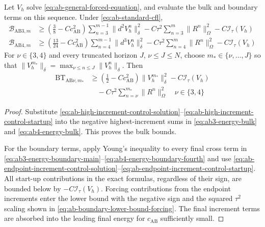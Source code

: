 \documentclass[11pt]{article}
\begin{document}
\begin{lem}
\label{lem:ab-bulk-boundary-lower-bounds}
Let \(V_h\) solve \eqref{eq:ab-general-forced-equation}, and evaluate the
bulk and boundary terms on this sequence. Under
\eqref{eq:ab-standard-cfl},
\begin{align}
\mathcal B_{\mathrm{AB3},m}
&\ge\left(\frac38-Cc_{\mathrm{AB}}^2\right)
\sum_{n=3}^{m-1}\|d^2V_h^n\|_{\delta}^2
-C\tau^2\sum_{n=3}^{m}\|R^n\|_{\Omega}^2
-C\mathcal I_{\tau}(V_h) \label{eq:ab3-bulk-lower-bound}\\
\mathcal B_{\mathrm{AB4},m}
&\ge\left(\frac{13}{24}-Cc_{\mathrm{AB}}^2\right)
\sum_{n=4}^{m-1}\|d^3V_h^n\|_{\delta}^2
-C\tau^2\sum_{n=4}^{m}\|R^n\|_{\Omega}^2
-C\mathcal I_{\tau}(V_h) \label{eq:ab4-bulk-lower-bound}
\end{align}
For \(\nu\in\{3,4\}\) and every truncated horizon \(J\), \(\nu\le J\le N\),
choose \(m_*\in\{\nu,\ldots,J\}\) so that
\(\|V_h^{m_*}\|_{\delta}=\max_{\nu\le n\le J}\|V_h^n\|_{\delta}\). Then
\begin{align}
\mathrm{BT}_{\mathrm{AB}\nu,m_*}
&\ge\left(\frac12-Cc_{\mathrm{AB}}^2\right)
\|V_h^{m_*}\|_{\delta}^2
-C\mathcal I_{\tau}(V_h) \label{eq:ab-boundary-lower-bound-solution}\\
&\quad-C\tau^2\sum_{n=\nu}^{m_*}\|R^n\|_{\Omega}^2
\quad \nu\in\{3,4\} \label{eq:ab-boundary-lower-bound-forcing}
\end{align}
\end{lem}
\begin{proof}
Substitute \eqref{eq:ab-high-increment-control-solution}--\eqref{eq:ab-high-increment-control-startup}
into the negative highest-increment sums in
\eqref{eq:ab3-energy-bulk} and \eqref{eq:ab4-energy-bulk}. This proves the
bulk bounds.

For the boundary terms, apply Young's inequality to every final cross term
in \eqref{eq:ab3-energy-boundary-main}--\eqref{eq:ab4-energy-boundary-fourth}
and use \eqref{eq:ab-endpoint-increment-control-solution}--\eqref{eq:ab-endpoint-increment-control-startup}.
All start-up contributions in the exact formulas, regardless of their sign,
are bounded below by \(-C\mathcal I_{\tau}(V_h)\). Forcing contributions from
the endpoint increments enter the lower bound with the negative sign and the
squared \(\tau^2\) scaling shown in
\eqref{eq:ab-boundary-lower-bound-forcing}. The final increment terms are
absorbed into the leading final energy for \(c_{\mathrm{AB}}\) sufficiently
small.
\end{proof}
\end{document}
